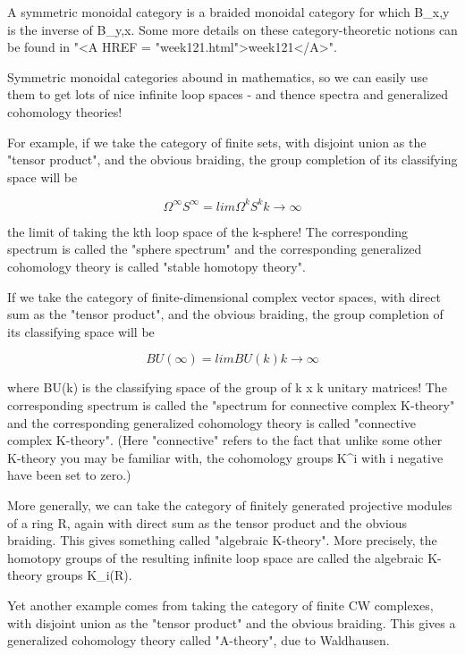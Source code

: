 A symmetric monoidal category is a braided monoidal category for which
B_{x,y} is the inverse of B_{y,x}.  Some more details
on these category-theoretic notions can be found in "<A HREF =
"week121.html">week121</A>".

Symmetric monoidal categories abound in mathematics, so we can easily use 
them to get lots of nice infinite loop spaces - and thence spectra and 
generalized cohomology theories!

For example, if we take the category of finite sets, with disjoint
union as the "tensor product", and the obvious braiding, 
the group completion of its classifying space will be


$$

\Omega ^{\infty } S^{\infty }  =  lim  \Omega ^{k} S^{k}
         k \to  \infty 
$$
    

the limit of taking the kth loop space of the k-sphere!  The
corresponding spectrum is called the "sphere spectrum" and
the corresponding generalized cohomology theory is called "stable
homotopy theory".

If we take the category of finite-dimensional complex vector spaces,
with direct sum as the "tensor product", and the obvious
braiding, the group completion of its classifying space will be


$$

BU(\infty ) =   lim        BU(k)
              k \to  \infty 
$$
    

where BU(k) is the classifying space of the group of k x k unitary
matrices!  The corresponding spectrum is called the "spectrum for
connective complex K-theory" and the corresponding generalized
cohomology theory is called "connective complex K-theory".  (Here
"connective" refers to the fact that unlike some other K-theory you
may be familiar with, the cohomology groups K^{i} with i negative have
been set to zero.)

More generally, we can take the category of finitely generated
projective modules of a ring R, again
with direct sum as the tensor product and the obvious braiding.  This
gives something called "algebraic K-theory".  More precisely, the 
homotopy 
groups of the resulting infinite loop space are called the algebraic K-theory
groups K_{i}(R).  

Yet another example comes from taking the category of finite CW
complexes, with disjoint union as the "tensor product" and the obvious
braiding.  This gives a generalized cohomology theory called
"A-theory", due to Waldhausen.

